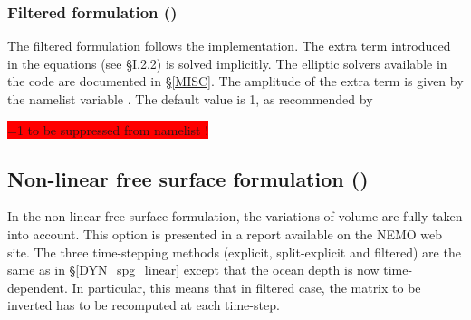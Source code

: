 \subsubsection{Filtered formulation ()}
\label{DYN_spg_flt}

The filtered formulation follows the \citet{Roullet2000} implementation. The extra term introduced in the equations (see {\S}I.2.2) is solved implicitly. The elliptic solvers available in the code are 
documented in \S\ref{MISC}. The amplitude of the extra term is given by the namelist variable . The default value is 1, as recommended by \citet{Roullet2000}

\colorbox{red}{=1 to be suppressed from namelist !}

\subsection{Non-linear free surface formulation ()}
\label{DYN_spg_vvl}

In the non-linear free surface formulation, the variations of volume are fully taken into account. This option is presented in a report \citep{Levier2007} available on the NEMO web site. The three time-stepping methods (explicit, split-explicit and filtered) are the same as in \S\ref{DYN_spg_linear} except that the ocean depth is now time-dependent. In particular, this means that in filtered case, the matrix to be inverted has to be recomputed at each time-step.


